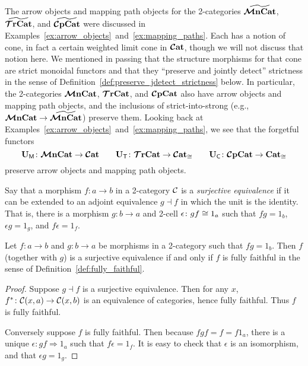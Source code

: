 \documentclass[11pt,oneside,article]{memoir}
\begin{document}
\begin{remark}
    \label{rem:pres_joint_detect}
  The arrow objects and mapping path objects for the 2-categories $\widetilde{\bm{\mathcal{M}}\mathbf{nCat}}$, $\widetilde{\bm{\mathcal{T}}\mathbf{rCat}}$,
  and $\widetilde{\bm{\mathcal{C}}\mathbf{pCat}}$ were discussed in
  Examples~\ref{ex:arrow_objects}~and~\ref{ex:mapping_paths}. Each has a notion of cone, in fact a
  certain weighted limit cone in $\bm{\mathcal{C}}\mathbf{at}$, though we will not discuss that notion here. We mentioned
  in passing that the structure morphisms for that cone are strict monoidal functors and that they
  ``preserve and jointly detect'' strictness in the sense of
  Definition~\ref{def:preserve_jdetect_strictness} below. In particular, the 2-categories
  $\bm{\mathcal{M}}\mathbf{nCat}$, $\bm{\mathcal{T}}\mathbf{rCat}$, and $\bm{\mathcal{C}}\mathbf{pCat}$ also have arrow objects and mapping path objects, and the
  inclusions of strict-into-strong (e.g., $\bm{\mathcal{M}}\mathbf{nCat}\to\widetilde{\bm{\mathcal{M}}\mathbf{nCat}}$) preserve them. Looking back
  at Examples~\ref{ex:arrow_objects}~and~\ref{ex:mapping_paths}, we see that the forgetful functors
  \[
    \mathbf{U}_{\mathsf{M}}\colon\bm{\mathcal{M}}\mathbf{nCat}\to\bm{\mathcal{C}}\mathbf{at}
    \qquad
    \mathbf{U}_{\mathsf{T}}\colon\bm{\mathcal{T}}\mathbf{rCat}\to\bm{\mathcal{C}}\mathbf{at}_{\cong}
    \qquad
    \mathbf{U}_{\mathsf{C}}\colon\bm{\mathcal{C}}\mathbf{pCat}\to\mathbf{Cat}_{\cong}
  \]
  preserve arrow objects and mapping path objects.
\end{remark}

\begin{definition}
    \label{def:surjective_equivalence}
  Say that a morphism $f\colon a\to b$ in a 2-category $\mathcal{C}$ is a \emph{surjective equivalence}
  if it can be extended to an adjoint equivalence $g\dashv f$ in which the unit is the identity.
  That is, there is a morphism $g\colon b\to a$ and 2-cell $\epsilon\colon gf\cong 1_a$ such that
  $fg=1_b$, $\epsilon g=1_g$, and $f\epsilon=1_f$.
\end{definition}

\begin{lemma}
    \label{lem:fully_faithful_surjective_equiv}
  Let $f\colon a\to b$ and $g\colon b\to a$ be morphisms in a 2-category such that $fg=1_b$. Then
  $f$ (together with $g$) is a surjective equivalence if and only if $f$ is fully faithful in the
  sense of Definition~\ref{def:fully_faithful}.
\end{lemma}
\begin{proof}
  Suppose $g\dashv f$ is a surjective equivalence. Then for any $x$,
  $f^*\colon\mathcal{C}(x,a)\to\mathcal{C}(x,b)$ is an equivalence of categories, hence fully faithful.
  Thus $f$ is fully faithful.

  Conversely suppose $f$ is fully faithful. Then because $fgf=f=f 1_a$, there is a unique
  $\epsilon\colon gf\Rightarrow 1_a$ such that $f\epsilon=1_f$. It is easy to check that $\epsilon$
  is an isomorphism, and that $\epsilon g=1_g$.
\end{proof}
\end{document}
